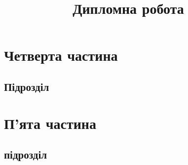 \documentclass{stvuz_khpi}
\title{Дипломна робота}
\begin{document}
                   
                  
                   
\section{Четверта частина}
\subsection{Підрозділ}
\section{П’ята частина}
\subsection{підрозділ}
\end{document}
